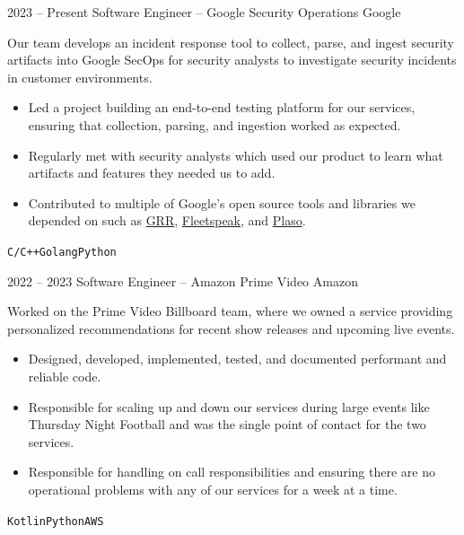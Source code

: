 \documentclass[9pt]{developercv} %
\begin{document}
\begin{entrylist}
  \entry
  {2023 -- Present}
  {Software Engineer -- Google Security Operations}
  {Google}
  {
    Our team develops an incident response tool to collect,
    parse, and ingest security artifacts into Google SecOps for security
    analysts to investigate security incidents in customer environments.

    \begin{itemize}[leftmargin=\parindent, leftmargin=*]

      \item
        Led a project building an end-to-end testing platform for our services,
        ensuring that collection, parsing, and ingestion worked as
        expected.
      \item
        Regularly met with security analysts which used our product to learn
        what artifacts and features they needed us to add.
      \item
        Contributed to multiple of Google's open source
        tools and libraries we depended on such as
        \href{https://github.com/google/grr}{GRR},
        \href{https://github.com/google/fleetspeak}{Fleetspeak}, and
        \href{https://github.com/log2timeline/plaso}{Plaso}.
    \end{itemize}

  \texttt{C/C++}\slashsep\texttt{Golang}\slashsep\texttt{Python}}
  \entry
  {2022 -- 2023}
  {Software Engineer -- Amazon Prime Video}
  {Amazon}
  {
    Worked on the Prime Video Billboard team, where we owned a service
    providing personalized recommendations for recent show releases and upcoming
    live events.

    \begin{itemize}[leftmargin=\parindent, leftmargin=*]
      \item Designed, developed, implemented, tested, and documented
        performant and reliable code.
      \item Responsible for scaling up and down our services during
        large events like Thursday Night Football and was the single
        point of contact for the two services.
      \item Responsible for handling on call responsibilities and
        ensuring there are no operational problems with any of our
        services for a week at a time.
    \end{itemize}

  \texttt{Kotlin}\slashsep\texttt{Python}\slashsep\texttt{AWS}}
\end{entrylist}
\end{document}
